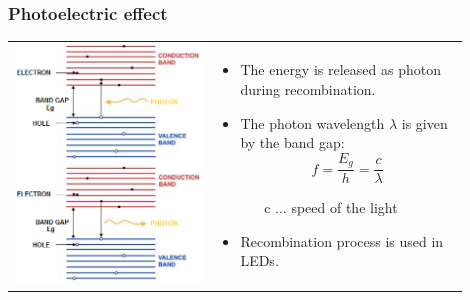 \documentclass{beamer}
\begin{document}
	\begin{frame}
    \frametitle{Photoelectric effect}
		\begin{center}
			\begin{tabular}{m{0.4\linewidth} m{0.5\linewidth}}
			\includegraphics[scale=0.43]{obr10_fotoel.png} &
			\small
			\begin{itemize}
				\item The energy is released as photon during recombination.
				\item The photon wavelength $\lambda$ is given by the band gap: $$f=\frac{E_g}{h}=\frac{c}{\lambda}$$
				
				\begin{itemize}
					\item[c]... speed of the light
				\end{itemize}
				\item Recombination process is used in LEDs.
			\end{itemize}
			\end{tabular}
		\end{center}
	\end{frame}
\end{document}
